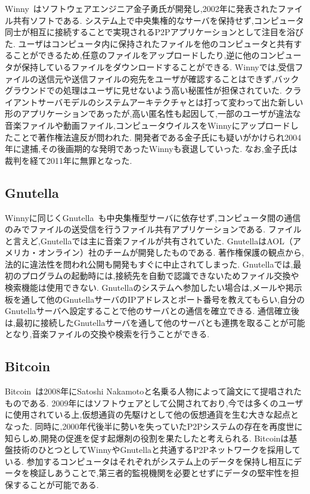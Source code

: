 Winny~\cite{Winny}はソフトウェアエンジニア金子勇氏が開発し,2002年に発表されたファイル共有ソフトである.
システム上で中央集権的なサーバを保持せず,コンピュータ同士が相互に接続することで実現されるP2Pアプリケーションとして注目を浴びた.
ユーザはコンピュータ内に保持されたファイルを他のコンピュータと共有することができるため,任意のファイルをアップロードしたり,逆に他のコンピュータが保持しているファイルをダウンロードすることができる.
Winnyでは,受信ファイルの送信元や送信ファイルの宛先をユーザが確認することはできず,バックグラウンドでの処理はユーザに見せないよう高い秘匿性が担保されていた.
クライアントサーバモデルのシステムアーキテクチャとは打って変わって出た新しい形のアプリケーションであったが,高い匿名性も起因して,一部のユーザが違法な音楽ファイルや動画ファイル,コンピュータウイルスをWinnyにアップロードしたことで著作権法違反が問われた.
開発者である金子氏にも疑いがかけられ2004年に逮捕,その後画期的な発明であったWinnyも衰退していった.
なお,金子氏は裁判を経て2011年に無罪となった.

\subsection{Gnutella}

Winnyに同じくGnutella~\cite{Gnutella}も中央集権型サーバに依存せず,コンピュータ間の通信のみでファイルの送受信を行うファイル共有アプリケーションである.
ファイルと言えど,Gnutellaでは主に音楽ファイルが共有されていた.
GnutellaはAOL（アメリカ・オンライン）社のチームが開発したものである.
著作権保護の観点から,法的に違法性を問われ公開も開発もすぐに中止されてしまった.
Gnutellaでは,最初のプログラムの起動時には,接続先を自動で認識できないためファイル交換や検索機能は使用できない.
Gnutellaのシステムへ参加したい場合は,メールや掲示板を通して他のGnutellaサーバのIPアドレスとポート番号を教えてもらい,自分のGnutellaサーバへ設定することで他のサーバとの通信を確立できる.
通信確立後は,最初に接続したGnutellaサーバを通して他のサーバとも連携を取ることが可能となり,音楽ファイルの交換や検索を行うことができる.

\subsection{Bitcoin}

Bitcoin~\cite{Bitcoin}は2008年にSatoshi Nakamotoと名乗る人物によって論文にて提唱されたものである.
2009年にはソフトウェアとして公開されており,今では多くのユーザに使用されている上,仮想通貨の先駆けとして他の仮想通貨を生む大きな起点となった.
同時に,2000年代後半に勢いを失っていたP2Pシステムの存在を再度世に知らしめ,開発の促進を促す起爆剤の役割を果たしたと考えられる.
Bitcoinは基盤技術のひとつとしてWinnyやGnutellaと共通するP2Pネットワークを採用している.
参加するコンピュータはそれぞれがシステム上のデータを保持し相互にデータを検証しあうことで,第三者的監視機関を必要とせずにデータの堅牢性を担保することが可能である.

